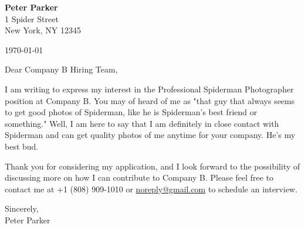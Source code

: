 \documentclass[12pt,a4paper]{article}
\newcommand{\company}{Company B}
\newcommand{\position}{Professional Spiderman Photographer}
\begin{document}
 

\begin{flushleft}
\textbf{Peter Parker}\\
1 Spider Street\\
New York, NY 12345\\
\end{flushleft}
\begin{flushright}
\today
\end{flushright}

\begin{flushleft}
    Dear \company{} Hiring Team,
\end{flushleft}

\vspace{0.5em}

\begin{flushleft}

I am writing to express my interest in the \position{} position at \company. You may of heard of me as "that guy that always seems to get good photos of Spiderman, like he is Spiderman's best friend or something." Well, I am here to say that I am definitely in close contact with Spiderman and can get quality photos of me anytime for your company. He's my best bud.
\vspace{1em}

Thank you for considering my application, and I look forward to the possibility of discussing more on how I can contribute to \company. 
Please feel free to contact me at +1 (808) 909-1010 or 
\href{mailto://noreply@gmail.com}{noreply@gmail.com} to schedule an interview.
\end{flushleft}

\vspace{1em}
\begin{flushleft}
Sincerely, \\[3em]
Peter Parker
\end{flushleft}
\end{document}
